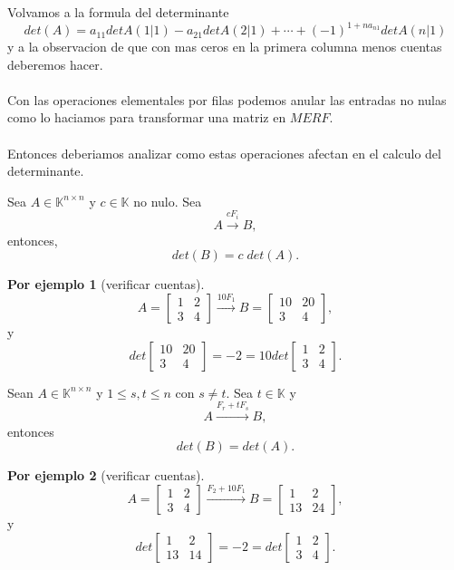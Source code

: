 \documentclass{article}
\theoremstyle{definition}
\theoremstyle{definition}
\newtheorem*{ej}{Por ejemplo}
\theoremstyle{remark}
\begin{document}
Volvamos a la formula del determinante \[
  det(A)=a_{11}detA(1|1)-a_{21}detA(2|1)+\cdots + (-1)^{1+na_{n1}}detA(n|1)
\]
y a la observacion de que con mas ceros en la primera columna menos cuentas deberemos hacer.\\\\
Con las operaciones elementales por filas podemos anular las entradas no nulas como lo haciamos para transformar una matriz en $MERF$.\\\\
Entonces deberiamos analizar como estas operaciones afectan en el calculo del determinante.
\begin{teo}[E1]
  Sea $A \in \mathbb{K}^{n \times n}$ y $c \in \mathbb{K}$ no nulo. Sea \[
    A \xrightarrow{cF_{i}}B,
  \]
  entonces, \[
det(B)=c\;det(A).
  \]
\end{teo}
\begin{ej}[verificar cuentas]
  \[
    A=\begin{bmatrix}1 & 2 \\ 3 & 4 \end{bmatrix} \xrightarrow{10F_1}B=\begin{bmatrix}10 & 20 \\ 3 & 4 \end{bmatrix},
  \]
  y
  \[
    det\begin{bmatrix}10 & 20 \\ 3 & 4 \end{bmatrix}=-2 = 10 det \begin{bmatrix}1 & 2 \\ 3 & 4 \end{bmatrix}.
  \]
\end{ej}
\begin{teo}[E2]
  Sean $A \in \mathbb{K}^{n \times n}$ y $1 \leq s,t \leq n$ con $s \neq t$. Sea $t \in \mathbb{K}$ y \[
    A \xrightarrow{F_r+tF_s} B,
  \]
  entonces \[
det(B)=det(A).
  \]
\end{teo}
\begin{ej}[verificar cuentas]
  \[
    A=\begin{bmatrix} 1 & 2 \\ 3 & 4 \end{bmatrix} \xrightarrow{F_2+10F_1} B =\begin{bmatrix}1 & 2 \\ 13 & 24 \end{bmatrix},
  \]
  y
  \[
    det \begin{bmatrix} 1 & 2 \\ 13 & 14 \end{bmatrix}=-2=det \begin{bmatrix}1 & 2 \\ 3 & 4 \end{bmatrix}.
  \]
\end{ej}
\end{document}
